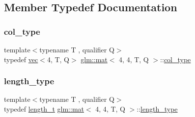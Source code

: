 \subsection{Member Typedef Documentation}
\mbox{\label{structglm_1_1mat_3_014_00_014_00_01_t_00_01_q_01_4_aad430dc291d0156d573c434be7fdecc1}} 
\subsubsection{\texorpdfstring{col\+\_\+type}{col\_type}}
{\footnotesize\ttfamily template$<$typename T , qualifier Q$>$ \\
typedef \mbox{\hyperlink{structglm_1_1vec}{vec}}$<$4, T, Q$>$ \mbox{\hyperlink{structglm_1_1mat}{glm\+::mat}}$<$ 4, 4, T, Q $>$\+::\mbox{\hyperlink{structglm_1_1mat_3_014_00_014_00_01_t_00_01_q_01_4_aad430dc291d0156d573c434be7fdecc1}{col\+\_\+type}}}

\mbox{\label{structglm_1_1mat_3_014_00_014_00_01_t_00_01_q_01_4_ae06c2957874bbff5701b304668b5cb01}} 
\subsubsection{\texorpdfstring{length\+\_\+type}{length\_type}}
{\footnotesize\ttfamily template$<$typename T , qualifier Q$>$ \\
typedef \mbox{\hyperlink{namespaceglm_a090a0de2260835bee80e71a702492ed9}{length\+\_\+t}} \mbox{\hyperlink{structglm_1_1mat}{glm\+::mat}}$<$ 4, 4, T, Q $>$\+::\mbox{\hyperlink{structglm_1_1mat_3_014_00_014_00_01_t_00_01_q_01_4_ae06c2957874bbff5701b304668b5cb01}{length\+\_\+type}}}

\mbox{\label{structglm_1_1mat_3_014_00_014_00_01_t_00_01_q_01_4_a2f05ded6544c98508d5f29e498d2e4dd}} 
